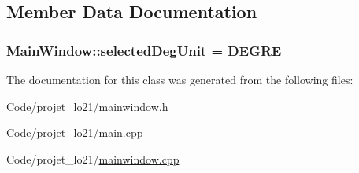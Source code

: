 \subsection{Member Data Documentation}
\hypertarget{class_main_window_afc05c1d46dbe05a4f21c57b4ed484a71}{
\subsubsection[{selected\-Deg\-Unit}]{ Main\-Window\-::selected\-Deg\-Unit = {\bf D\-E\-G\-R\-E}\hspace{0.3cm}{\ttfamily [static]}}}\label{class_main_window_afc05c1d46dbe05a4f21c57b4ed484a71}


The documentation for this class was generated from the following files\-:\begin{DoxyCompactItemize}
\item 
Code/projet\-\_\-lo21/\hyperlink{mainwindow_8h}{mainwindow.\-h}\item 
Code/projet\-\_\-lo21/\hyperlink{main_8cpp}{main.\-cpp}\item 
Code/projet\-\_\-lo21/\hyperlink{mainwindow_8cpp}{mainwindow.\-cpp}\end{DoxyCompactItemize}

